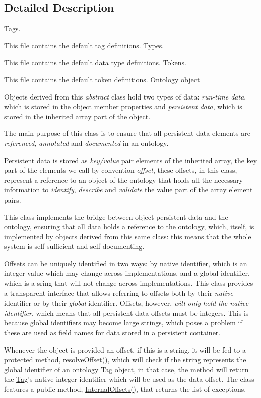 \subsection{Detailed Description}
Tags.

This file contains the default tag definitions. Types.

This file contains the default data type definitions. Tokens.

This file contains the default token definitions. Ontology object

Objects derived from this {\itshape abstract} class hold two types of data\-: {\itshape run-\/time data}, which is stored in the object member properties and {\itshape persistent data}, which is stored in the inherited array part of the object.

The main purpose of this class is to ensure that all persistent data elements are {\itshape referenced}, {\itshape annotated} and {\itshape documented} in an ontology.

Persistent data is stored as {\itshape key/value} pair elements of the inherited array, the key part of the elements we call by convention {\itshape offset}, these offsets, in this class, represent a reference to an object of the ontology that holds all the necessary information to {\itshape identify}, {\itshape describe} and {\itshape validate} the value part of the array element pairs.

This class implements the bridge between object persistent data and the ontology, ensuring that all data holds a reference to the ontology, which, itself, is implemented by objects derived from this same class\-: this means that the whole system is self sufficient and self documenting.

Offsets can be uniquely identified in two ways\-: by native identifier, which is an integer value which may change across implementations, and a global identifier, which is a sring that will not change across implementations. This class provides a transparent interface that allows referring to offsets both by their {\itshape native} identifier or by their {\itshape global} identifier. Offsets, however, {\itshape will only hold the native identifier}, which means that all persistent data offsets must be integers. This is because global identifiers may become large strings, which poses a problem if these are used as field names for data stored in a persistent container.

Whenever the object is provided an offset, if this is a string, it will be fed to a protected method, \hyperlink{class_ontology_wrapper_1_1_ontology_object_a2b3dac52af65a0008dc4a026ddaac36b}{resolve\-Offset()}, which will check if the string represents the global identifier of an ontology \hyperlink{class_ontology_wrapper_1_1_tag}{Tag} object, in that case, the method will return the \hyperlink{class_ontology_wrapper_1_1_tag}{Tag}'s native integer identifier which will be used as the data offset. The class features a public method, \hyperlink{class_ontology_wrapper_1_1_ontology_object_a1ec71ca3fd7be57916082804c1a30124}{Internal\-Offsets()}, that returns the list of exceptions.

